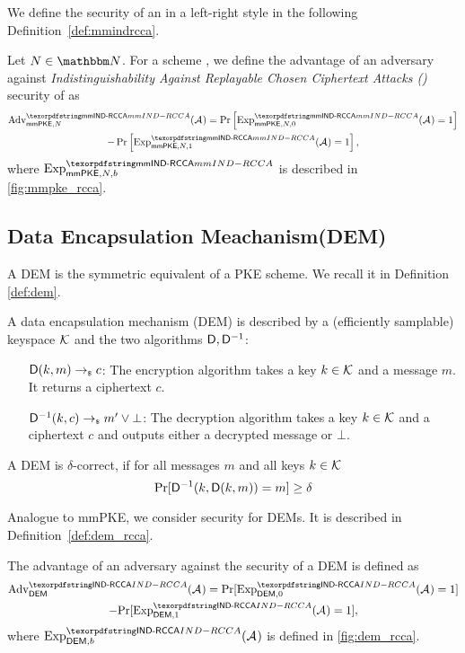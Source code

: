 We define the security of an \mmPKE in a left-right style in the following Definition~\ref{def:mmindrcca}.

\begin{definition}[\mmindrcca]\label{def:mmindrcca}
Let $N\in\N$. For a scheme \mmPKE, we define the advantage of an adversary \Adv against \emph{Indistinguishability Against Replayable Chosen Ciphertext Attacks (\mmindrcca)} security of \mmPKE as
\begin{multline*}
  \adv{\mmindrcca}{\mmPKE, \nUsers}(\Adv) = \Pr\left[\Exp^{\mmindrcca}_{\mmPKE,\nUsers, 0}(\Adv) = 1\right] \\ -
      \Pr\left[\Exp^{\mmindrcca}_{\mmPKE,\nUsers,1}(\Adv) = 1\right],
\end{multline*}
where $\textnormal{Exp}^{\mmindrcca}_{\mmPKE,N,b}$ is described in \cref{fig:mmpke_rcca}.
\end{definition}


\subsection{Data Encapsulation Meachanism(DEM)}
A DEM is the symmetric equivalent of a PKE scheme. We recall it in Definition \ref{def:dem}.

\begin{definition}[DEM]\label{def:dem}
  A data encapsulation mechanism (DEM) \dem is described by a (efficiently samplable) keyspace $\mathcal{K}$ and the two
  algorithms ${\mathsf{D}}, {\mathsf{D}}^{-1}$:
  \begin{itemize}[align=left]
    \item[${\mathsf{D}}(k, m)\rightarrow_{\scriptscriptstyle\$} c$:] The encryption algorithm takes a key $k\in\mathcal{K}$ and a message $m$. It returns a ciphertext $c$.
    \item[${\mathsf{D}}^{-1}(k, c) \rightarrow_{\scriptscriptstyle\$} m'\lor\bot$:] The decryption algorithm takes a key $k\in\mathcal{K}$ and a
      ciphertext $c$ and outputs either a decrypted message or $\bot$.
    \end{itemize}
    A DEM \dem is $\delta$-correct, if for all messages $m$ and all keys $k\in\mathcal{K}$
    \[
      \text{Pr}[{\mathsf{D}}^{-1}(k, {\mathsf{D}}(k,m)) = m] \geq \delta
    \]
  \end{definition}

  Analogue to mmPKE, we consider \indrcca security for DEMs. It is described in Definition~\ref{def:dem_rcca}.

  \begin{definition}\label{def:dem_rcca}
    The advantage of an adversary \Adv against the \indrcca security of a DEM \dem is defined as
    \begin{multline*}
      \adv{\indrcca}{\dem}(\Adv) = \text{Pr}[\experiment{\indrcca}{\dem, 0}(\Adv) = 1] \\-
      \text{Pr}[\experiment{\indrcca}{\dem, 1}(\Adv) = 1],
    \end{multline*}
    where $\experiment{\indrcca}{\dem, b}(\Adv)$ is defined in \cref{fig:dem_rcca}.
  \end{definition}

